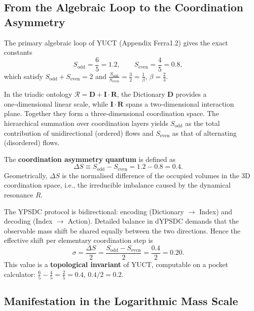 \documentclass[12pt,a4paper]{article}
\begin{document}
\subsection{From the Algebraic Loop to the Coordination Asymmetry}

The primary algebraic loop of YUCT (Appendix Ferra1.2) gives the exact constants
\begin{equation}
	S_{\mathrm{odd}} = \frac{6}{5} = 1.2,\qquad S_{\mathrm{even}} = \frac{4}{5} = 0.8,
\end{equation}
which satisfy $\displaystyle S_{\mathrm{odd}}+S_{\mathrm{even}}=2$ and $\displaystyle \frac{S_{\mathrm{odd}}}{S_{\mathrm{even}}}=\frac{3}{2}=\frac{1}{\beta}$, $\beta=\frac{2}{3}$.

In the triadic ontology $\mathcal{R}=\mathbf{D}+\mathbf{I}\!\cdot\!\mathbf{R}$, the Dictionary $\mathbf{D}$ provides a one‑dimensional linear scale, while $\mathbf{I}\!\cdot\!\mathbf{R}$ spans a two‑dimensional interaction plane. Together they form a three‑dimensional coordination space. The hierarchical summation over coordination layers yields $S_{\mathrm{odd}}$ as the total contribution of unidirectional (ordered) flows and $S_{\mathrm{even}}$ as that of alternating (disordered) flows.

The \textbf{coordination asymmetry quantum} is defined as
\begin{equation}
	\Delta S \equiv S_{\mathrm{odd}} - S_{\mathrm{even}} = 1.2 - 0.8 = 0.4.
	\label{eq:DS}
\end{equation}
Geometrically, $\Delta S$ is the normalised difference of the occupied volumes in the 3D coordination space, i.e., the irreducible imbalance caused by the dynamical resonance $R$.

The YPSDC protocol is bidirectional: encoding (Dictionary $\to$ Index) and decoding (Index $\to$ Action). Detailed balance in dYPSDC demands that the observable mass shift be shared equally between the two directions. Hence the effective shift per elementary coordination step is
\begin{equation}
	\boxed{\sigma = \frac{\Delta S}{2} = \frac{S_{\mathrm{odd}} - S_{\mathrm{even}}}{2} = \frac{0.4}{2} = 0.20.}
	\label{eq:sigma}
\end{equation}
This value is a \textbf{topological invariant} of YUCT, computable on a pocket calculator: $\frac{6}{5} - \frac{4}{5} = \frac{2}{5} = 0.4$, $0.4/2 = 0.2$.

\subsection{Manifestation in the Logarithmic Mass Scale}
\end{document}
